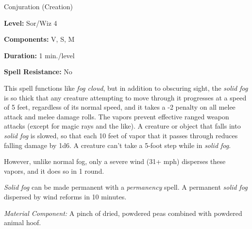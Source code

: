 
Conjuration (Creation)

\textbf{Level:} Sor/Wiz 4

\textbf{Components:} V, S, M

\textbf{Duration:} 1 min./level

\textbf{Spell Resistance:} No

This spell functions like \textit{fog cloud}, but in addition to obscuring sight, 
the \textit{solid fog} is so thick that any creature attempting to move through 
it progresses at a speed of 5 feet, regardless of its normal speed, and it takes 
a -2 penalty on all melee attack and melee damage rolls. The vapors prevent effective 
ranged weapon attacks (except for magic rays and the like). A creature or object 
that falls into \textit{solid fog} is slowed, so that each 10 feet of vapor that 
it passes through reduces falling damage by 1d6. A creature can't take a 5-foot 
step while in \textit{solid fog}.

However, unlike normal fog, only a severe wind (31+ mph) disperses these vapors, 
and it does so in 1 round.

\textit{Solid fog} can be made permanent with a \textit{permanency} spell. A permanent 
\textit{solid fog} dispersed by wind reforms in 10 minutes.

\textit{Material Component:} A pinch of dried, powdered peas combined with powdered 
animal hoof.

